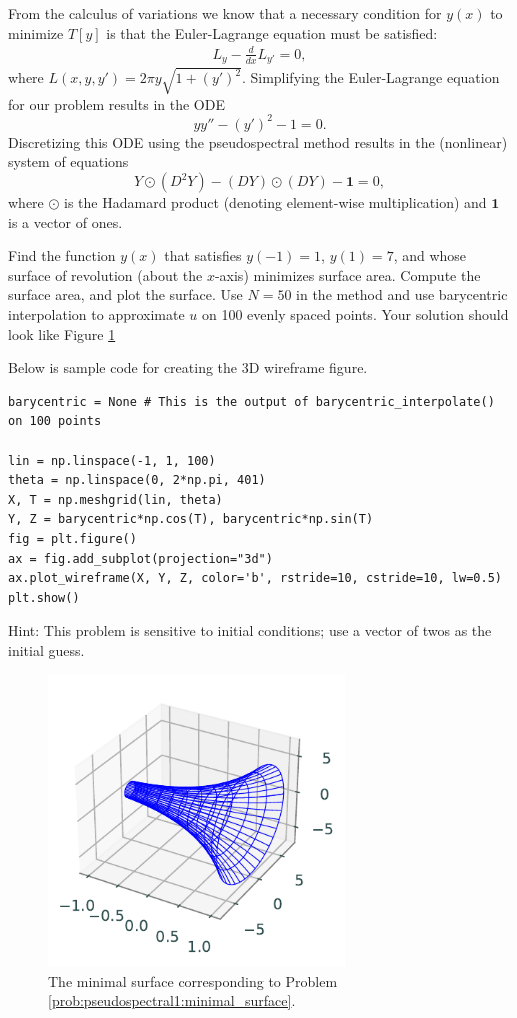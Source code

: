From the calculus of variations we know that a necessary condition for $y(x)$ to minimize $T[y]$ is that the Euler-Lagrange equation must be satisfied:
\begin{align*}
	L_y - \frac{d}{dx}L_{y'} = 0,
\end{align*}
where $L(x,y,y') = 2 \pi y \sqrt{1 + (y')^2}$.
Simplifying the Euler-Lagrange equation for our problem results in the ODE
\begin{equation*}
	y y'' - (y')^2 -1 = 0.
\end{equation*}
Discretizing this ODE using the pseudospectral method results in the (nonlinear) system of equations
\begin{equation*}
	Y \odot (D^2 Y) - (DY) \odot (DY) - \mathbf{1} = 0,
\end{equation*}
where $\odot$ is the Hadamard product (denoting element-wise multiplication) and  $\mathbf{1}$ is a vector of ones.

\begin{problem}
Find the function $y(x)$ that satisfies $y(-1) = 1$, $y(1) = 7$, and whose surface of revolution (about the $x$-axis) minimizes surface area.
Compute the surface area, and plot the surface.
Use $N = 50$ in the  method and use barycentric interpolation to approximate $u$ on 100 evenly spaced points.
Your solution should look like Figure \ref{fig:pseudospectral1:minimal_surface}

Below is sample code for creating the 3D wireframe figure.
\begin{lstlisting}
barycentric = None # This is the output of barycentric_interpolate() on 100 points

lin = np.linspace(-1, 1, 100)
theta = np.linspace(0, 2*np.pi, 401)
X, T = np.meshgrid(lin, theta)
Y, Z = barycentric*np.cos(T), barycentric*np.sin(T)
fig = plt.figure()
ax = fig.add_subplot(projection="3d")
ax.plot_wireframe(X, Y, Z, color='b', rstride=10, cstride=10, lw=0.5)
plt.show()
\end{lstlisting}
Hint: This problem is sensitive to initial conditions; use a vector of twos as the initial guess. 
\label{prob:pseudospectral1:minimal_surface}
\end{problem}

\begin{figure}
\centering
\includegraphics[width=0.7\textwidth]{figures/minimal_surface.pdf}
\caption{The minimal surface corresponding to Problem \ref{prob:pseudospectral1:minimal_surface}.}
\label{fig:pseudospectral1:minimal_surface}
\end{figure}

